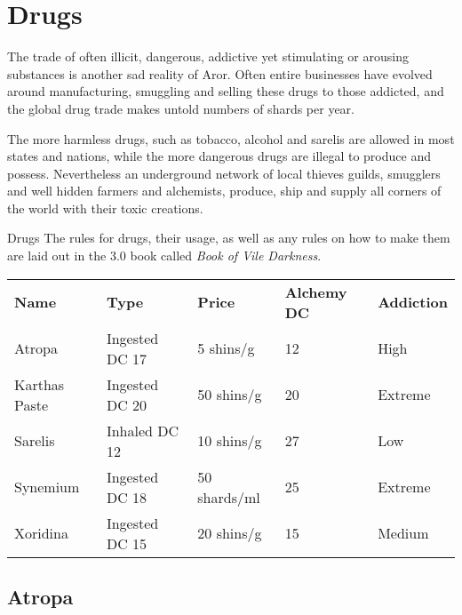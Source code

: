 \section{Drugs}
\label{sec:Drugs}

The trade of often illicit, dangerous, addictive yet stimulating or arousing
substances is another sad reality of Aror. Often entire businesses have
evolved around manufacturing, smuggling and selling these drugs to those
addicted, and the global drug trade makes untold numbers of shards per year.

The more harmless drugs, such as tobacco, alcohol and sarelis are allowed in
most states and nations, while the more dangerous drugs are illegal to produce
and possess. Nevertheless an underground network of local thieves guilds,
smugglers and well hidden farmers and alchemists, produce, ship and supply all
corners of the world with their toxic creations.

\begin{35e}{Drugs}
  The rules for drugs, their usage, as well as any rules on how to make them
  are laid out in the 3.0 book called \emph{Book of Vile Darkness}.
\end{35e}

\begin{table*}[!htb]
  \caption{Overview of Drugs}
  \begin{tabular}{l l l l l}
    \textbf{Name} & \textbf{Type}  & \textbf{Price} & \textbf{Alchemy DC} & \textbf{Addiction} \\
    Atropa        & Ingested DC 17 & 5 shins/g      & 12                  & High \\
    Karthas Paste & Ingested DC 20 & 50 shins/g     & 20                  & Extreme \\
    Sarelis       & Inhaled DC 12  & 10 shins/g     & 27                  & Low \\
    Synemium      & Ingested DC 18 & 50 shards/ml   & 25                  & Extreme \\
    Xoridina      & Ingested DC 15 & 20 shins/g     & 15                  & Medium \\
  \end{tabular}
\end{table*}

\subsection{Atropa}
\label{sec:Atropa}

